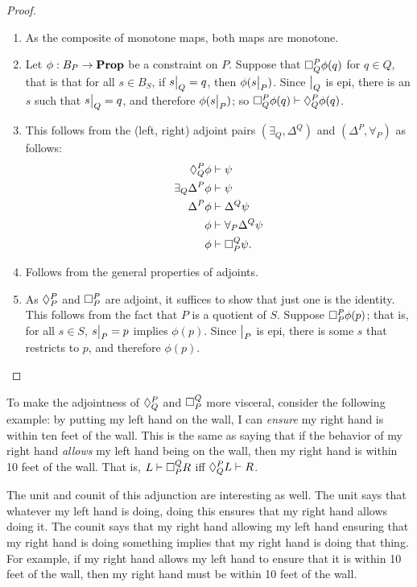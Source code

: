     \begin{proof}
    ~
    \begin{enumerate}
        \item As the composite of monotone maps, both maps are monotone.
        \item Let $\phi : B_P \to \Prop$ be a constraint on $P$. Suppose that $\ensure{P}{Q}\phi(q)$ for $q \in Q$, that is that for all $s \in B_S$, if $\rest{s}{Q} = q$, then $\phi(\rest{s}{P})$. Since $\rest{}{Q}$ is epi, there is an $s$ such that $\rest{s}{Q} = q$, and therefore $\phi(\rest{s}{P})$; so $\ensure{P}{Q}\phi(q) \vdash \allows{P}{Q}\phi(q)$.
        \item This follows from the (left, right) adjoint pairs $(\exists_Q, \Delta^Q)$ and $(\Delta^P, \forall_P)$ as follows:
        \begin{align*}
            \allows{P}{Q} \phi &\vdash \psi \\ 
            \exists_Q \Delta^P \phi &\vdash \psi \\
            \Delta^P \phi &\vdash \Delta^Q \psi \\ 
            \phi &\vdash \forall_P \Delta^Q \psi \\
            \phi &\vdash \ensure{Q}{P} \psi.
        \end{align*}
        \item Follows from the general properties of adjoints.
        \item As $\allows{P}{P}$ and $\ensure{P}{P}$ are adjoint, it suffices to show that just one is the identity. This follows from the fact that $P$ is a quotient of $S$. Suppose $\ensure{P}{P}\phi(p)$; that is, for all $s \in S$, $\rest{s}{P} = p$ implies $\phi(p)$. Since $\rest{}{P}$ is epi, there is some $s$ that restricts to $p$, and therefore $\phi(p)$. \qedhere
        
    \end{enumerate}
    \end{proof}
    
 To make the adjointness of $\allows{P}{Q}$ and $\ensure{Q}{P}$ more visceral, consider the following example: by putting my left hand on the wall, I can \emph{ensure} my right hand is within ten feet of the wall. This is the same as saying that if the behavior of my right hand \emph{allows} my left hand being on the wall, then my right hand is within 10 feet of the wall. That is, $L\vdash\ensure{Q}{P}R$ iff $\allows{P}{Q}L\vdash R$.
    
    The unit and counit of this adjunction are interesting as well. The unit
    says that whatever my left hand is doing, doing this ensures that my right
    hand allows doing it. The counit says that my right hand allowing my left hand ensuring that my right hand is doing something implies
    that my right hand is doing that thing. For example, if my right hand allows
    my left hand to ensure that it is within 10 feet of the wall, then my right hand must be within 10 feet of the wall.
    
